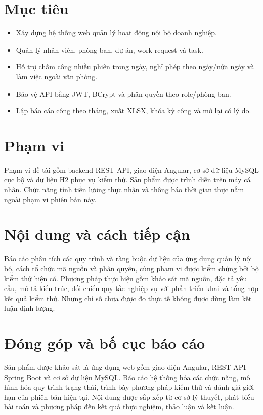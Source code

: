 \documentclass[12pt,a4paper,oneside]{report}
\begin{document}
\section{Mục tiêu}
\begin{itemize}
\item Xây dựng hệ thống web quản lý hoạt động nội bộ doanh nghiệp.
\item Quản lý nhân viên, phòng ban, dự án, work request và task.
\item Hỗ trợ chấm công nhiều phiên trong ngày, nghỉ phép theo ngày/nửa ngày và làm việc ngoài văn phòng.
\item Bảo vệ API bằng JWT, BCrypt và phân quyền theo role/phòng ban.
\item Lập báo cáo công theo tháng, xuất XLSX, khóa kỳ công và mở lại có lý do.
\end{itemize}

\section{Phạm vi}
Phạm vi đề tài gồm backend REST API, giao diện Angular, cơ sở dữ liệu MySQL cục bộ và dữ liệu H2 phục vụ kiểm thử. Sản phẩm được trình diễn trên máy cá nhân. Chức năng tính tiền lương thực nhận và thông báo thời gian thực nằm ngoài phạm vi phiên bản này.

\section{Nội dung và cách tiếp cận}
Báo cáo phân tích các quy trình và ràng buộc dữ liệu của ứng dụng quản lý nội bộ, cách tổ chức mã nguồn và phân quyền, cùng phạm vi được kiểm chứng bởi bộ kiểm thử hiện có. Phương pháp thực hiện gồm khảo sát mã nguồn, đặc tả yêu cầu, mô tả kiến trúc, đối chiếu quy tắc nghiệp vụ với phần triển khai và tổng hợp kết quả kiểm thử. Những chỉ số chưa được đo thực tế không được dùng làm kết luận định lượng.

\section{Đóng góp và bố cục báo cáo}
Sản phẩm được khảo sát là ứng dụng web gồm giao diện Angular, REST API Spring Boot và cơ sở dữ liệu MySQL. Báo cáo hệ thống hóa các chức năng, mô hình hóa quy trình trạng thái, trình bày phương pháp kiểm thử và đánh giá giới hạn của phiên bản hiện tại. Nội dung được sắp xếp từ cơ sở lý thuyết, phát biểu bài toán và phương pháp đến kết quả thực nghiệm, thảo luận và kết luận.
\end{document}
